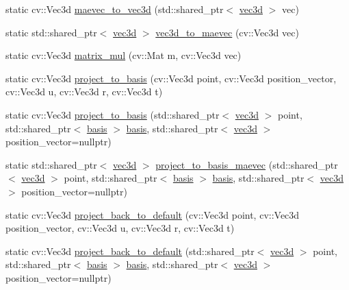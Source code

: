 \begin{DoxyCompactItemize}
static cv\-::\-Vec3d \hyperlink{classmae_1_1math_1_1math_a0d941a0b007c67fb64789e6813848465}{maevec\-\_\-to\-\_\-vec3d} (std\-::shared\-\_\-ptr$<$ \hyperlink{classmae_1_1math_1_1vec3d}{vec3d} $>$ vec)
\item 
static std\-::shared\-\_\-ptr$<$ \hyperlink{classmae_1_1math_1_1vec3d}{vec3d} $>$ \hyperlink{classmae_1_1math_1_1math_a42b4752057b831506e2ab128fe25cf36}{vec3d\-\_\-to\-\_\-maevec} (cv\-::\-Vec3d vec)
\item 
static cv\-::\-Vec3d \hyperlink{classmae_1_1math_1_1math_ac167e791fb84a8b70435e6f91b611515}{matrix\-\_\-mul} (cv\-::\-Mat m, cv\-::\-Vec3d vec)
\item 
static cv\-::\-Vec3d \hyperlink{classmae_1_1math_1_1math_a8a701ca325c85b0fd8aeb9fcf16ae831}{project\-\_\-to\-\_\-basis} (cv\-::\-Vec3d point, cv\-::\-Vec3d position\-\_\-vector, cv\-::\-Vec3d u, cv\-::\-Vec3d r, cv\-::\-Vec3d t)
\item 
static cv\-::\-Vec3d \hyperlink{classmae_1_1math_1_1math_a9bf43740b418313f18d8d8c7b8ba0208}{project\-\_\-to\-\_\-basis} (std\-::shared\-\_\-ptr$<$ \hyperlink{classmae_1_1math_1_1vec3d}{vec3d} $>$ point, std\-::shared\-\_\-ptr$<$ \hyperlink{classmae_1_1math_1_1basis}{basis} $>$ \hyperlink{classmae_1_1math_1_1basis}{basis}, std\-::shared\-\_\-ptr$<$ \hyperlink{classmae_1_1math_1_1vec3d}{vec3d} $>$ position\-\_\-vector=nullptr)
\item 
static std\-::shared\-\_\-ptr$<$ \hyperlink{classmae_1_1math_1_1vec3d}{vec3d} $>$ \hyperlink{classmae_1_1math_1_1math_ad50e3118b3ea1b4ad1ffe3b52958c4b8}{project\-\_\-to\-\_\-basis\-\_\-maevec} (std\-::shared\-\_\-ptr$<$ \hyperlink{classmae_1_1math_1_1vec3d}{vec3d} $>$ point, std\-::shared\-\_\-ptr$<$ \hyperlink{classmae_1_1math_1_1basis}{basis} $>$ \hyperlink{classmae_1_1math_1_1basis}{basis}, std\-::shared\-\_\-ptr$<$ \hyperlink{classmae_1_1math_1_1vec3d}{vec3d} $>$ position\-\_\-vector=nullptr)
\item 
static cv\-::\-Vec3d \hyperlink{classmae_1_1math_1_1math_a418176aa7d23e7d12c2d620dee771b5d}{project\-\_\-back\-\_\-to\-\_\-default} (cv\-::\-Vec3d point, cv\-::\-Vec3d position\-\_\-vector, cv\-::\-Vec3d u, cv\-::\-Vec3d r, cv\-::\-Vec3d t)
\item 
static cv\-::\-Vec3d \hyperlink{classmae_1_1math_1_1math_a8d1ab0d935ea2f9ae7c9a5aea6ad14e8}{project\-\_\-back\-\_\-to\-\_\-default} (std\-::shared\-\_\-ptr$<$ \hyperlink{classmae_1_1math_1_1vec3d}{vec3d} $>$ point, std\-::shared\-\_\-ptr$<$ \hyperlink{classmae_1_1math_1_1basis}{basis} $>$ \hyperlink{classmae_1_1math_1_1basis}{basis}, std\-::shared\-\_\-ptr$<$ \hyperlink{classmae_1_1math_1_1vec3d}{vec3d} $>$ position\-\_\-vector=nullptr)

\end{DoxyCompactItemize}
